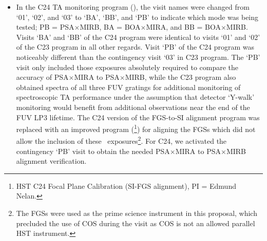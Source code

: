 \begin{itemize}
{pointing as the external exposures.
Some exposures were slightly lengthened to take advantage of the increased efficiency of the modified OSM2 home position.\footnote{The OSM2 home position was changed from G185M to MIRA on July 6, 2015 (2015.157).}
The contingency visit (`03') was not executed in C23.
}
\item{
In the C24 TA monitoring program (), the visit names were changed from
`01', `02', and `03' to `BA', `BB', and `PB' to indicate which 
mode was being tested; PB = PSA$\times$MIRB, BA = BOA$\times$MIRA, and BB = BOA$\times$MIRB.
Visits `BA' and `BB' of the C24 program were identical to visits `01' and `02' of the C23 program in all other regards.
Visit `PB' of the C24 program was noticeably different than the contingency visit `03' in C23 program.
The `PB' visit only included those exposures absolutely required to compare the  accuracy of PSA$\times$MIRA to PSA$\times$MIRB, while the C23 program also obtained spectra of all three FUV gratings for additional monitoring of spectroscopic TA performance under the assumption that detector `Y-walk' monitoring would benefit from additional observations near the end of the FUV LP3 lifetime.
The C24 version of the FGS-to-SI alignment program was replaced with an improved program (\footnote{HST C24 Focal Plane Calibration (SI-FGS alignment), PI = Edmund Nelan.}) for aligning the FGSs which did not allow the inclusion of these ~exposures\footnote{The FGSs were used as the prime science instrument in this proposal, which precluded the use of COS during the visit as COS is not an allowed parallel HST instrument.}.
For C24, we activated the contingency `PB' visit to obtain the needed PSA$\times$MIRA to PSA$\times$MIRB  alignment verification.
}
\end{itemize}
